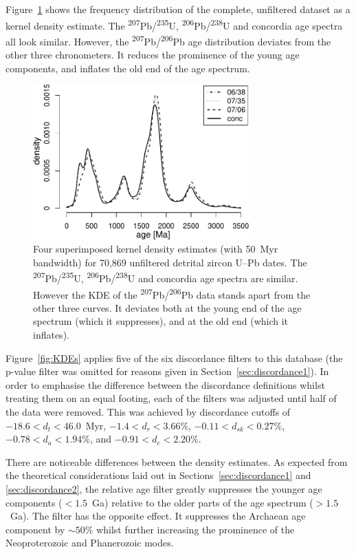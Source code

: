\documentclass[gchron, manuscript]{copernicus}
\begin{document}
Figure~\ref{fig:KDE} shows the frequency distribution of the complete,
unfiltered dataset as a kernel density estimate. The
\textsuperscript{207}Pb/\textsuperscript{235}U,
\textsuperscript{206}Pb/\textsuperscript{238}U and concordia age
spectra all look similar. However, the
\textsuperscript{207}Pb/\textsuperscript{206}Pb age distribution
deviates from the other three chronometers. It reduces the prominence
of the young age components, and inflates the old end of the age
spectrum.

\begin{figure}[t]
  \includegraphics[width=8.3cm]{KDE.pdf}
  \caption{Four superimposed kernel density estimates (with 50~Myr
    bandwidth) for 70,869 unfiltered detrital zircon U--Pb dates. The
    \textsuperscript{207}Pb/\textsuperscript{235}U,
    \textsuperscript{206}Pb/\textsuperscript{238}U and concordia age
    spectra are similar.  However the KDE of the
    \textsuperscript{207}Pb/\textsuperscript{206}Pb data stands apart
    from the other three curves. It deviates both at the young end of
    the age spectrum (which it suppresses), and at the old end (which
    it inflates).  }
  \label{fig:KDE}
\end{figure}

Figure~\ref{fig:KDEs} applies five of the six discordance filters to
this database (the p-value filter was omitted for reasons given in
Section~\ref{sec:discordance1}). In order to emphasise the difference
between the discordance definitions whilst treating them on an equal
footing, each of the filters was adjusted until half of the data were
removed. This was achieved by discordance cutoffs of
$-18.6<d_t<46.0$~Myr, $-1.4<d_r<3.66$\%, $-0.11<d_{sk}<0.27$\%,
$-0.78<d_{a}<1.94$\%, and $-0.91<d_c<2.20$\%.

There are noticeable differences between the density estimates.  As
expected from the theoretical considerations laid out in
Sections~\ref{sec:discordance1} and \ref{sec:discordance2}, the
relative age filter greatly suppresses the younger age components
($<1.5$~Ga) relative to the older parts of the age spectrum
($>1.5$~Ga). The \citet{stacey1975} filter has the opposite effect.
It suppresses the Archaean age component by $\sim{50}$\% whilst
further increasing the prominence of the Neoproterozoic and
Phanerozoic modes.
\end{document}
